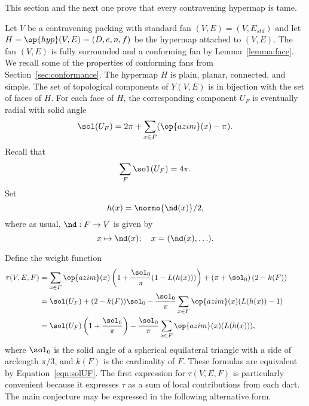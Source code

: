 This section and the next one prove that every contravening hypermap is tame.

Let $V$ be a contravening packing with standard fan
$(V,E)=(V,E_{std})$ and let $H=\op{hyp}(V,E)=(D,e,n,f)$ be the
hypermap attached to $(V,E)$.  The fan $(V,E)$ is fully surrounded and
a conforming fan by Lemma~\ref{lemma:face}.  We recall some of the
properties of conforming fans from Section~\ref{sec:conformance}.  The
hypermap $H$ is plain, planar, connected, and simple.  The set of
topological components of $Y(V,E)$ is in bijection with the set of
faces of $H$.  %
For each face of $H$, the corresponding component $U_F$ is eventually
radial with solid angle 
%
%
%
%
\begin{equation}\label{eqn:solUF}
\sol(U_F) = 2\pi + \sum_{x\in F} (\op{azim}(x) -\pi).
\end{equation}
Recall that
\begin{equation} 
\sum_{F} \sol(U_F) = 4\pi.
\end{equation}
Set 
\[ h(x) = \normo{\nd(x)}/2,\] 
where as usual, $\nd:F\to V$ is given by
\[ 
x \mapsto \nd(x); \quad   x = (\nd(x),\ldots).
\] 


Define the weight function
\begin{align}
  \tau(V,E,F) &=\sum_{x\in F} \op{azim}(x)
  \left(1 + \dfrac{\sol_0}{\pi}(1- L(h(x)))\right) 
  + \left(\pi+{\sol_0}\right) (2- k(F))\qquad\phantom{t}\vspace{6pt}\nonumber\\
  &= \sol(U_F) + (2- k(F))\sol_0 - \dfrac{\sol_0}{\pi}
\sum_{x\in F}\op{azim}(x) (L(h(x)) - 1)\vspace{6pt}\nonumber\\
  &= \sol(U_F) \left( 1 + \dfrac{\sol_0}{\pi}\right) 
- \dfrac{\sol_0}{\pi} \sum_{x\in F} \op{azim}(x)(L(h(x))),\label{eqn:tau-sol}
\end{align}
where $\sol_0$ is the solid angle of a spherical equilateral triangle with a side of arclength $\pi/3$, and $k(F)$ is the cardinality of $F$.
% 
These formulas are equivalent by Equation~\ref{eqn:solUF}.  
The first expression for $\tau(V,E,F)$
is particularly convenient because it expresses $\tau$ as a sum of
local contributions from each dart.  
%
%
%
%
The main conjecture may be expressed in the following alternative
form.

